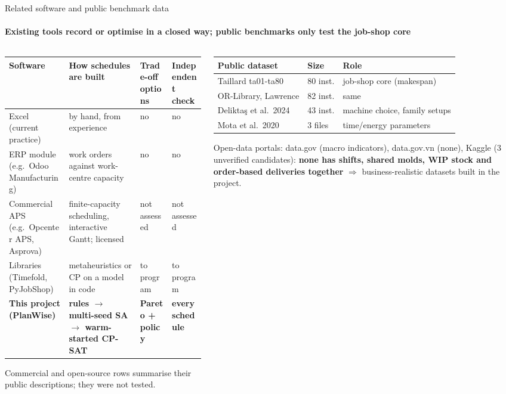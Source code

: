 \begin{frame}{Related software and public benchmark data}
\framesubtitle{Existing tools record or optimise in a closed way; public benchmarks only test the job-shop core}
\begin{columns}[T]
\begin{column}{0.56\textwidth}
\tiny
\setlength{\tabcolsep}{3pt}
\begin{tabular}{@{}L{2.05cm}L{2.35cm}L{1.35cm}L{1.25cm}@{}}
\toprule
Software & How schedules are built & Trade-off options & Independent check\\
\midrule
Excel (current practice) & by hand, from experience & no & no\\
ERP module (e.g.\ Odoo Manufacturing) & work orders against work-centre capacity & no & no\\
Commercial APS (e.g.\ Opcenter APS, Asprova) & finite-capacity scheduling, interactive Gantt; licensed & not assessed & not assessed\\
Libraries (Timefold, PyJobShop) & metaheuristics or CP on a model in code & to program & to program\\
\midrule
\textbf{This project (PlanWise)} & \textbf{rules $\to$ multi-seed SA $\to$ warm-started CP-SAT} & \textbf{Pareto + policy} & \textbf{every schedule}\\
\bottomrule
\end{tabular}
\vspace{0.3em}

{\tiny Commercial and open-source rows summarise their public descriptions; they were not tested.\par}
\end{column}
\begin{column}{0.41\textwidth}
\tiny
\begin{tabular}{@{}L{2.35cm}L{0.95cm}L{1.95cm}@{}}
\toprule
Public dataset & Size & Role\\
\midrule
Taillard ta01-ta80 & 80 inst. & job-shop core (makespan)\\
OR-Library, Lawrence & 82 inst. & same\\
Deliktaş et al.\ 2024 & 43 inst. & machine choice, family setups\\
Mota et al.\ 2020 & 3 files & time/energy parameters\\
\bottomrule
\end{tabular}
\vspace{0.4em}

\scriptsize Open-data portals: data.gov (macro indicators), data.gov.vn (none), Kaggle (3 unverified candidates):
\textbf{none has shifts, shared molds, WIP stock and order-based deliveries together} $\Rightarrow$ business-realistic datasets built in the project.
\end{column}
\end{columns}
\end{frame}

